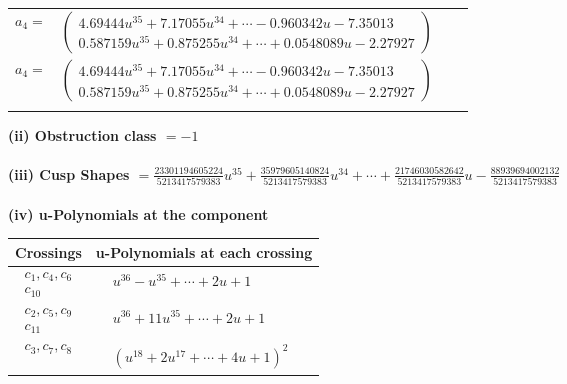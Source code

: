 \documentclass[1p]{elsarticle_modified}
\theoremstyle{definition}
\begin{document}
\begin{tabular}{m{7pt} m{180pt} m{7pt} m{180pt} }
\flushright $a_{4}=$&$\begin{pmatrix}4.69444 u^{35}+7.17055 u^{34}+\cdots-0.960342 u-7.35013\\0.587159 u^{35}+0.875255 u^{34}+\cdots+0.0548089 u-2.27927\end{pmatrix}$\\ \flushright $a_{4}=$&$\begin{pmatrix}4.69444 u^{35}+7.17055 u^{34}+\cdots-0.960342 u-7.35013\\0.587159 u^{35}+0.875255 u^{34}+\cdots+0.0548089 u-2.27927\end{pmatrix}$\\&\end{tabular}
\flushleft \textbf{(ii) Obstruction class $= -1$}\\~\\
\flushleft \textbf{(iii) Cusp Shapes $= \frac{23301194605224}{5213417579383} u^{35}+\frac{35979605140824}{5213417579383} u^{34}+\cdots+\frac{21746030582642}{5213417579383} u-\frac{88939694002132}{5213417579383}$}\\~\\
\newpage\renewcommand{\arraystretch}{1}
\flushleft \textbf{(iv) u-Polynomials at the component}\newline \\
\begin{tabular}{m{50pt}|m{274pt}}
Crossings & \hspace{64pt}u-Polynomials at each crossing \\
\hline $$\begin{aligned}c_{1},c_{4},c_{6}\\c_{10}\end{aligned}$$&$\begin{aligned}
&u^{36}- u^{35}+\cdots+2 u+1
\end{aligned}$\\
\hline $$\begin{aligned}c_{2},c_{5},c_{9}\\c_{11}\end{aligned}$$&$\begin{aligned}
&u^{36}+11 u^{35}+\cdots+2 u+1
\end{aligned}$\\
\hline $$\begin{aligned}c_{3},c_{7},c_{8}\end{aligned}$$&$\begin{aligned}
&(u^{18}+2 u^{17}+\cdots+4 u+1)^{2}
\end{aligned}$\\
\hline
\end{tabular}\\~\\
\end{document}

